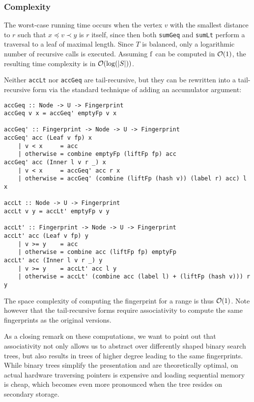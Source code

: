 \subsubsection{Complexity}

The worst-case running time occurs when the vertex $v$ with the smallest distance to $r$ such that $x \preceq v \prec y$ is $r$ itself, since then both \texttt{sumGeq} and \texttt{sumLt} perform a traversal to a leaf of maximal length. Since $T$ is balanced, only a logarithmic number of recursive calls is executed. Assuming $\operatorname{f}$ can be computed in $\mathcal{O}(1)$, the resulting time complexity is in $\mathcal{O}(\log(|{S}|))$.

Neither \texttt{accLt} nor \texttt{accGeq} are tail-recursive, but they can be rewritten into a tail-recursive form via the standard technique of adding an accumulator argument:

\begin{verbatim}
accGeq :: Node -> U -> Fingerprint
accGeq v x = accGeq' emptyFp v x

accGeq' :: Fingerprint -> Node -> U -> Fingerprint
accGeq' acc (Leaf v fp) x
    | v < x     = acc
    | otherwise = combine emptyFp (liftFp fp) acc
accGeq' acc (Inner l v r _) x
    | v < x     = accGeq' acc r x
    | otherwise = accGeq' (combine (liftFp (hash v)) (label r) acc) l x

accLt :: Node -> U -> Fingerprint
accLt v y = accLt' emptyFp v y

accLt' :: Fingerprint -> Node -> U -> Fingerprint
accLt' acc (Leaf v fp) y
    | v >= y    = acc
    | otherwise = combine acc (liftFp fp) emptyFp
accLt' acc (Inner l v r _) y
    | v >= y    = accLt' acc l y
    | otherwise = accLt' (combine acc (label l) + (liftFp (hash v))) r y
\end{verbatim}

The space complexity of computing the fingerprint for a range is thus $\mathcal{O}(1)$. Note however that the tail-recursive forms require associativity to compute the same fingerprints as the original versions.

As a closing remark on these computations, we want to point out that associativity not only allows us to abstract over differently shaped binary search trees, but also results in trees of higher degree leading to the same fingerprints. While binary trees simplify the presentation and are theoretically optimal, on actual hardware traversing pointers is expensive and loading sequential memory is cheap, which becomes even more pronounced when the tree resides on secondary storage.

